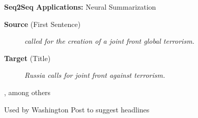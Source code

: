 \documentclass{beamer}
\let\tempone\itemize
\let\temptwo\enditemize
\renewenvironment{itemize}{\tempone\addtolength{\itemsep}{0.5\baselineskip}}{\temptwo}
\newcommand{\air}{\vspace{0.25cm}}
\newcommand{\mair}{\vspace{-0.25cm}}
\newcommand{\Cite}[1]{{\footnotesize \citep{#1}}}
\begin{document}


\begin{frame}
  \centerline{\textbf{Seq2Seq Applications:} \alert{Neural Summarization} \Cite{Rush2015} }
  \begin{center}
    \textbf{Source} (First Sentence)
  \end{center}
  
  \begin{figure}
    \textit{
      called  for the creation of
      a joint front  global terrorism. }
  \end{figure}

  \begin{center}
    \textbf{Target} (Title)
  \end{center}
  \mair

  \begin{figure}
    \centering
    \textit{\alert<2>{Russia} calls for joint
      front \alert<2>{against} terrorism.}
  \end{figure}

\air
\air

  \begin{itemize}
  \item \Cite{mou2015backward} \Cite{cheng2016neural} \Cite{toutanovadataset} \Cite{wang2016experimental} \Cite{takaseneural}, among others
  \item Used by Washington Post to suggest headlines \Cite{shuguangwang}
  \end{itemize}
\end{frame}
\end{document}
